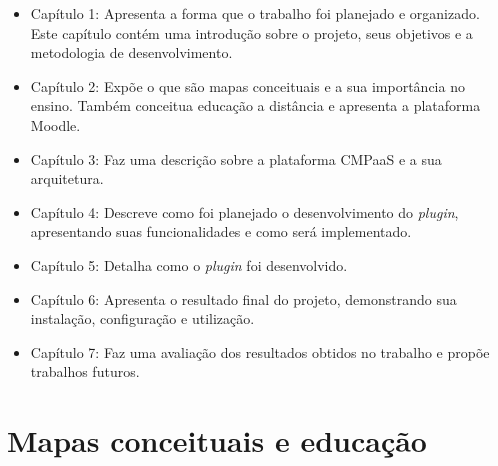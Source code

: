 \documentclass[
	12pt,				%
	openright,			%
	oneside,			%
	a4paper,			%
	english,			%
	french,				%
	spanish,			%
	brazil				%
	]{abntex2}
\begin{document}
\begin{itemize}
	\item Capítulo 1: Apresenta a forma que o trabalho foi planejado e organizado. Este capítulo contém uma introdução sobre o projeto, seus objetivos e a metodologia de desenvolvimento.
	\item Capítulo 2: Expõe o que são mapas conceituais e a sua importância no ensino. Também conceitua educação a distância e apresenta a plataforma Moodle.
	\item Capítulo 3: Faz uma descrição sobre a  plataforma CMPaaS e a sua arquitetura.    
	\item Capítulo 4: Descreve como foi planejado o desenvolvimento do \textit{plugin}, apresentando suas funcionalidades e como será implementado.
	\item Capítulo 5: Detalha como o \textit{plugin} foi desenvolvido.
	\item Capítulo 6: Apresenta o resultado final do projeto, demonstrando sua instalação, configuração e utilização.
	\item Capítulo 7: Faz uma avaliação dos resultados obtidos no trabalho e propõe trabalhos futuros.
\end{itemize} 





\chapter{Mapas conceituais e educação}\label{cap-maps}
\end{document}
